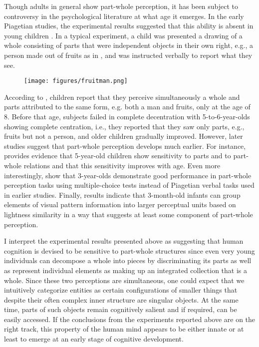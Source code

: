 Though adults in general show part-whole perception, it has been subject to controversy in the psychological literature at what age it emerges. In the early Piagetian studies, the experimental results suggested that this ability is absent in young children \citep{elkind_koegler_go1964studies}. In a typical experiment, a child was presented a drawing of a whole consisting of parts that were independent objects in their own right, e.g., a person made out of fruits as in , and was instructed verbally to report what they see. 

\begin{figure}[h!]
\centering
\texttt{[image: figures/fruitman.png]}
\label{fig:part-whole-perception}
\end{figure}

According to \citeauthor{elkind_koegler_go1964studies}, children report that they perceive simultaneously a whole and parts attributed to the same form, e.g. both a man and fruits, only at the age of 8. Before that age, subjects failed in complete decentration with 5-to-6-year-olds showing complete centration, i.e., they reported that they saw only parts, e.g., fruits but not a person, and older children gradually improved. However, later studies suggest that part-whole perception develops much earlier. For instance, \citet{kimchi1993basic} provides evidence that 5-year-old children show sensitivity to parts and to part-whole relations and that this sensitivity improves with age. Even more interestingly, \citet{boisvert_standing_moller1999successful} show that 3-year-olds demonstrate good performance in part-whole perception tasks using multiple-choice tests instead of Piagetian verbal tasks used in earlier studies. Finally,  results indicate that 3-month-old infants can group elements of visual pattern information into larger perceptual units based on lightness similarity in a way that suggests at least some component of part-whole perception.

I interpret the experimental results presented above as suggesting that human cognition is devised to be sensitive to part-whole structures since even very young individuals can decompose a whole into pieces by discriminating its parts as well as represent individual elements as making up an integrated collection that is a whole. Since these two perceptions are simultaneous, one could expect that we intuitively categorize entities as certain configurations of smaller things that despite their often complex inner structure are singular objects. At the same time, parts of such objects remain cognitively salient and if required, can be easily accessed. If the conclusions from the experiments reported above are on the right track, this property of the human mind appears to be either innate or at least to emerge at an early stage of cognitive development.

